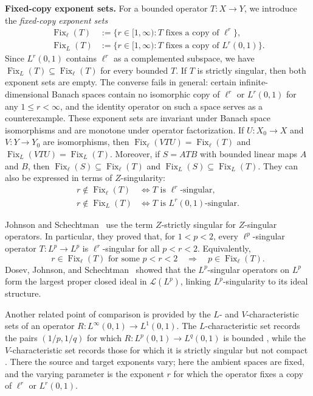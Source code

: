 \documentclass[11pt, reqno]{amsart}
\theoremstyle{definition}
\theoremstyle{remark}
\begin{document}
 
\medskip\noindent\textbf{Fixed-copy exponent sets.}
For a bounded operator \(T:X\to Y\), we introduce the
\emph{fixed-copy exponent sets}
\[
\begin{aligned}
\operatorname{Fix}_\ell(T)
&:=
\{r\in[1,\infty):T\text{ fixes a copy of }\ell^r\},\\
\operatorname{Fix}_L(T)
&:=
\{r\in[1,\infty):T\text{ fixes a copy of }L^r(0,1)\}.
\end{aligned}
\]
Since \(L^r(0,1)\) contains \(\ell^r\) as a complemented subspace,
we have
\(\operatorname{Fix}_{L}(T)\subseteq\operatorname{Fix}_{\ell}(T)\)
for every bounded \(T\). If \(T\) is strictly singular, then both exponent sets are empty.
The converse fails in general: certain infinite-dimensional Banach
spaces contain no isomorphic copy of \(\ell^r\) or \(L^r(0,1)\) for
any \(1\le r<\infty\), and the identity operator on such a space
serves as a counterexample.
These exponent sets are invariant under Banach space isomorphisms and
are monotone under operator factorization.
If \(U:X_0\to X\) and \(V:Y\to Y_0\) are isomorphisms, then
\(\operatorname{Fix}_{\ell}(VTU)=\operatorname{Fix}_{\ell}(T)\) and
\(\operatorname{Fix}_{L}(VTU)=\operatorname{Fix}_{L}(T)\).
Moreover, if \(S=ATB\) with bounded linear maps \(A\) and \(B\), then
\(\operatorname{Fix}_{\ell}(S)\subseteq\operatorname{Fix}_{\ell}(T)\)
and
\(\operatorname{Fix}_{L}(S)\subseteq\operatorname{Fix}_{L}(T)\). They can also be expressed in
terms of \(Z\)-singularity:
\[
\begin{aligned}
r\notin\operatorname{Fix}_{\ell}(T)
&\Longleftrightarrow
T\text{ is }\ell^r\text{-singular},\\
r\notin\operatorname{Fix}_{L}(T)
&\Longleftrightarrow
T\text{ is }L^r(0,1)\text{-singular}.
\end{aligned}
\]


Johnson and Schechtman~\cite{JohnsonSchechtman2008} use the term
\(Z\)-strictly singular for \(Z\)-singular operators. In particular,
they proved that, for \(1<p<2\), every \(\ell^p\)-singular operator
\(T:L^p\to L^p\) is \(\ell^r\)-singular for all \(p<r<2\).
Equivalently,
\[
        r\in\operatorname{Fix}_{\ell}(T)
        \text{ for some }p<r<2
        \quad\Longrightarrow\quad
        p\in\operatorname{Fix}_{\ell}(T).
\]
Dosev, Johnson, and Schechtman~\cite{DosevJohnsonSchechtman2013}
showed that the \(L^p\)-singular operators on \(L^p\) form the largest
proper closed ideal in \(\mathcal L(L^p)\), linking
\(L^p\)-singularity to its ideal structure.

Another related point of comparison is provided by the
\(L\)- and \(V\)-characteristic sets of an operator
\(R:L^\infty(0,1)\to L^1(0,1)\).
The \(L\)-characteristic set records the pairs \((1/p,1/q)\) for which
\(R:L^p(0,1)\to L^q(0,1)\) is bounded
\cite{HernandezSemenovTradacete2017}, while the
\(V\)-characteristic set records those for which it is strictly
singular but not compact
\cite{HernandezSemenovTradacete2017,
HernandezSemenovTradacete2023}.
There the source and target exponents vary; here the ambient spaces
are fixed, and the varying parameter is the exponent \(r\) for which
the operator fixes a copy of \(\ell^r\) or \(L^r(0,1)\).
\end{document}
